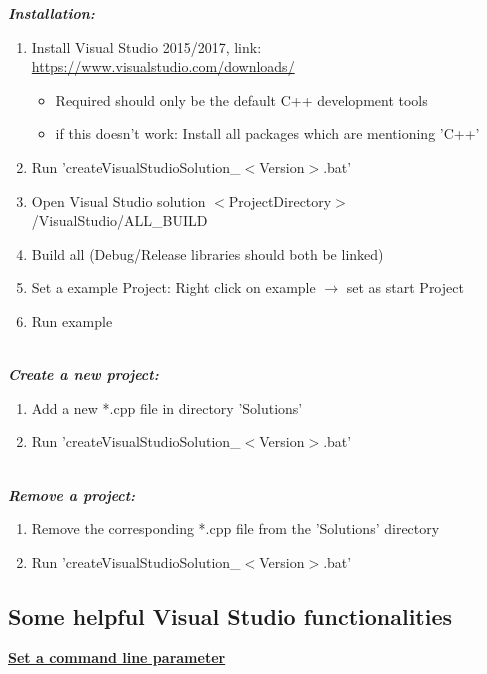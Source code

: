 \documentclass[]{article}
\begin{document}
\textit{\textbf{Installation:}}
\begin{enumerate}
	\item Install Visual Studio 2015/2017, link: \url{https://www.visualstudio.com/downloads/}
	\begin{itemize}
		\item Required should only be the default C++ development tools
		\item if this doesn't work: Install all packages which are mentioning 'C++'
	\end{itemize}
	\item Run 'createVisualStudioSolution\_$<$Version$>$.bat'
	\item Open Visual Studio solution $<$ProjectDirectory$>$/VisualStudio/ALL\_BUILD
	\item Build all (Debug/Release libraries should both be linked)
	\item Set a example Project: Right click on example $\rightarrow$ set as start Project
	\item Run example 
\end{enumerate}

\mbox{} \\
\textit{\textbf{Create a new project:}}
\begin{enumerate}
\item Add a new *.cpp file in directory 'Solutions'
\item Run 'createVisualStudioSolution\_$<$Version$>$.bat'
\end{enumerate}

\mbox{} \\
\textit{\textbf{Remove a project:}}
\begin{enumerate}
\item Remove the corresponding *.cpp file from the 'Solutions' directory
\item Run 'createVisualStudioSolution\_$<$Version$>$.bat' \\
\end{enumerate}

\subsection{Some helpful Visual Studio functionalities \\}

\underline{\textbf{Set a command line parameter}} \\
\end{document}
